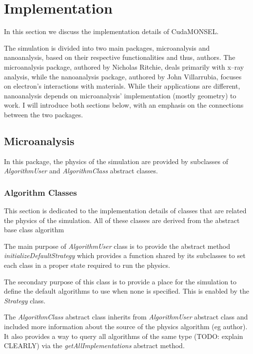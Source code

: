 \chapter{Implementation}\label{impl}
In this section we discuss the implementation details of CudaMONSEL.

The simulation is divided into two main packages, microanalysis and nanoanalysis, based on their respective functionalities and thus, authors. The microanalysis package, authored by Nicholas Ritchie, deals primarily with x--ray analysis, while the nanoanalysis package, authored by John Villarrubia, focuses on electron's interactions with materials. While their applications are different, nanoanalysis depends on microanalysis' implementation (mostly geometry) to work. I will introduce both sections below, with an emphasis on the connections between the two packages.

\section{Microanalysis}
In this package, the physics of the simulation are provided by subclasses of \emph{AlgorithmUser} and \emph{AlgorithmClass} abstract classes.

\subsection{Algorithm Classes}
This section is dedicated to the implementation details of classes that are related the physics of the simulation. All of these classes are derived from the abstract base class algorithm 

The main purpose of \emph{AlgorithmUser} class is to provide the abstract method \emph{initializeDefaultStrategy} which provides a function shared by its subclasses to set each class in a proper state required to run the physics. 

The secondary purpose of this class is to provide a place for the simulation to define the default algorithms to use when none is specified. This is enabled by the \emph{Strategy} class.

The \emph{AlgorithmClass} abstract class inherits from \emph{AlgorithmUser} abstract class and included more information about the source of the physics algorithm (eg author). It also provides a way to query all algorithms of the same type (TODO: explain CLEARLY) via the \emph{getAllImplementations} abstract method.

\subsubsection{}


